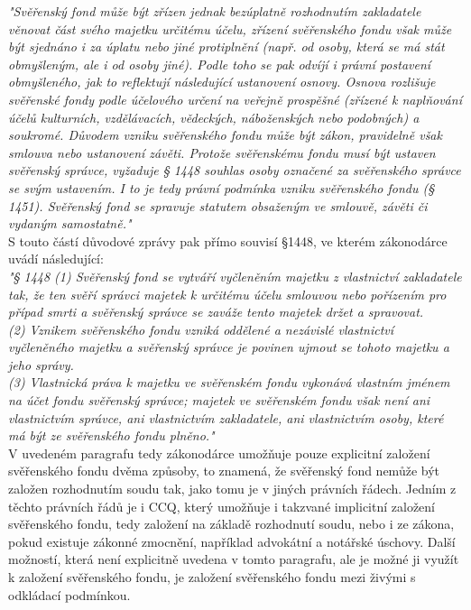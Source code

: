 \documentclass{article}
\begin{document}
\textit{"Svěřenský fond může být zřízen jednak bezúplatně rozhodnutím zakladatele věnovat část svého majetku určitému účelu, zřízení svěřenského fondu však může být sjednáno i za úplatu nebo jiné protiplnění (např. od osoby, která se má stát obmyšleným, ale i od osoby jiné). Podle toho se pak odvíjí i právní postavení obmyšleného, jak to reflektují následující ustanovení osnovy. Osnova rozlišuje svěřenské fondy podle účelového určení na veřejně prospěšné (zřízené k naplňování účelů kulturních, vzdělávacích, vědeckých, náboženských nebo podobných) a soukromé. Důvodem vzniku svěřenského fondu může být zákon, pravidelně však smlouva nebo ustanovení závěti. Protože svěřenskému fondu musí být ustaven svěřenský správce, vyžaduje § 1448 souhlas osoby označené za svěřenského správce se svým ustavením. I to je tedy právní podmínka vzniku svěřenského fondu (§ 1451). Svěřenský fond se spravuje statutem obsaženým ve smlouvě, závěti či vydaným samostatně."}\\

S touto částí důvodové zprávy pak přímo souvisí §1448, ve kterém zákonodárce uvádí následující:\\

\textit{"§ 1448
(1) Svěřenský fond se vytváří vyčleněním majetku z vlastnictví zakladatele tak, že ten svěří správci majetek k určitému účelu smlouvou nebo pořízením pro případ smrti a svěřenský správce se zaváže tento majetek držet a spravovat.\\
(2) Vznikem svěřenského fondu vzniká oddělené a nezávislé vlastnictví vyčleněného majetku a svěřenský správce je povinen ujmout se tohoto majetku a jeho správy.\\
(3) Vlastnická práva k majetku ve svěřenském fondu vykonává vlastním jménem na účet fondu svěřenský správce; majetek ve svěřenském fondu však není ani vlastnictvím správce, ani vlastnictvím zakladatele, ani vlastnictvím osoby, které má být ze svěřenského fondu plněno."}\\

V uvedeném paragrafu tedy zákonodárce umožňuje pouze explicitní založení svěřenského fondu dvěma způsoby, to znamená, že svěřenský fond nemůže být založen rozhodnutím soudu tak, jako tomu je v jiných právních řádech. Jedním z těchto právních řádů je i CCQ, který umožňuje i takzvané implicitní založení svěřenského fondu, tedy založení na základě rozhodnutí soudu, nebo i ze zákona, pokud existuje zákonné zmocnění, například advokátní a notářské úschovy. Další možností, která není explicitně uvedena v tomto paragrafu, ale je možné ji využít k založení svěřenského fondu, je založení svěřenského fondu mezi živými s odkládací podmínkou.\\
\end{document}
